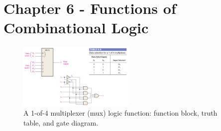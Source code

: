 \documentclass[10pt]{article}
\begin{document}
\section{Chapter 6 - Functions of Combinational Logic}
\label{sec:comb2}

\begin{figure}[ht]
\centering
\includegraphics[width=0.5\textwidth]{figures/mux4.pdf}
\caption{\label{fig:mux4} A 1-of-4 multiplexer (mux) logic function: function block, truth table, and gate diagram.}
\end{figure}
\end{document}
